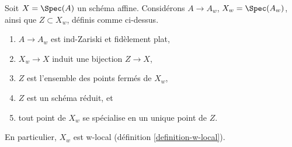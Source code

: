 \begin{lemma}
\label{lemma-make-w-local}
Soit $X = \Spec(A)$ un sch\'ema affine. Consid\'erons $A \to A_w$, $X_w = \Spec(A_w)$,
ainsi que $Z \subset X_w$, d\'efinis comme ci-dessus.
\begin{enumerate}
\item $A \to A_w$ est ind-Zariski et fid\`element plat,
\item $X_w \to X$ induit une bijection $Z \to X$,
\item $Z$ est l'ensemble des points ferm\'es de $X_w$,
\item $Z$ est un sch\'ema r\'eduit, et
\item tout point de $X_w$ se sp\'ecialise en un unique point de $Z$.
\end{enumerate}
En particulier, $X_w$ est w-local (d\'efinition \ref{definition-w-local}).
\end{lemma}


